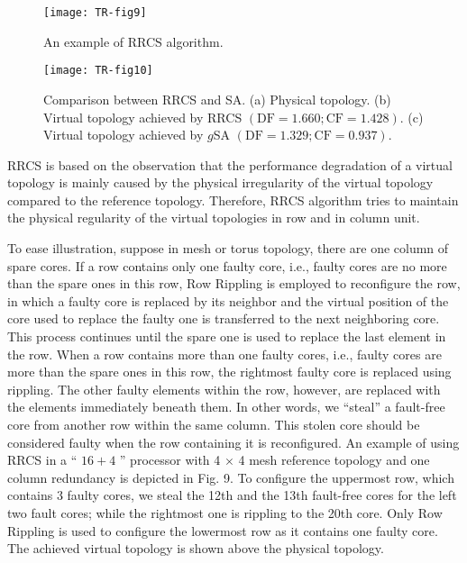 \begin{figure}[t]
      \centering
        \texttt{[image: TR-fig9]}
          \caption{An example of RRCS algorithm.}
             \label{fig9}
\end{figure}

\begin{figure}[h]
      \centering
        \texttt{[image: TR-fig10]}
          \caption{Comparison between RRCS and SA. (a) Physical topology. (b) Virtual topology achieved by RRCS $(\mathrm{DF}=1.660 ; \mathrm{CF}=1.428)$. (c) Virtual topology achieved by  $g$SA $(\mathrm{DF}=1.329 ; \mathrm{CF}=0.937)$. }
        \label{fig10}
\end{figure}


RRCS is based on the observation that the performance degradation of a virtual topology is mainly caused by the physical irregularity of the virtual topology compared to the reference topology. Therefore, RRCS algorithm tries to maintain the physical regularity of the virtual topologies in row and in column unit.

To ease illustration, suppose in mesh or torus topology, there are one column of spare cores. If a row contains only one faulty core, i.e., faulty cores are no more than the spare ones in this row, Row Rippling is employed to reconfigure the row, in which a faulty core is replaced by its neighbor and the virtual position of the core used to replace the faulty one is transferred to the next neighboring core. This process continues until the spare one is used to replace the last element in the row. When a row contains more than one faulty cores, i.e., faulty cores are more than the spare ones in this row, the rightmost faulty core is replaced using rippling. The other faulty elements within the row, however, are replaced with the elements immediately beneath them. In other words, we “steal” a fault-free core from another row within the same column. This stolen core should be considered faulty when the row containing it is reconfigured. An example of using RRCS in a “ $16+4$ ” processor with 4 $\times$ 4 mesh reference topology and one column redundancy is depicted in Fig. 9. To configure the uppermost row, which contains 3 faulty cores, we steal the 12th and the 13th fault-free cores for the left two fault cores; while the rightmost one is rippling to the 20th core. Only Row Rippling is used to configure the lowermost row as it contains one faulty core. The achieved virtual topology is shown above the physical topology.

